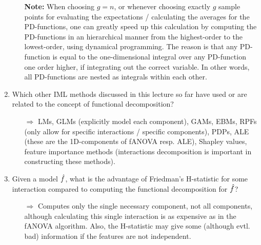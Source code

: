 \begin{enumerate}
\begin{itemize}
            \textbf{Note:}
            When choosing $g = n$, or whenever choosing exactly $g$ sample points for evaluating the expectations / calculating the averages for the PD-functions, one can greatly speed up this calculation by computing the PD-functions in an hierarchical manner from the highest-order to the lowest-order, using dynamical programming.
            The reason is that any PD-function is equal to the one-dimensional integral over any PD-function one order higher, if integrating out the correct variable.
            In other words, all PD-functions are nested as integrals within each other.
    \end{itemize}
    \item 
    Which other IML methods discussed in this lecture so far have used or are related to the concept of functional decomposition?
    \begin{itemize}
        \item[$\Rightarrow$] LMs, GLMs (explicitly model each component), GAMs, EBMs, RPFs (only allow for specific interactions / specific components), PDPs, ALE (these are the 1D-components of fANOVA resp. ALE), Shapley values, feature importance methods (interactions decomposition is important in constructing these methods).
    \end{itemize}
    \item 
    Given a model $\hat{f}$, what is the advantage of Friedman's H-statistic for some interaction compared to computing the functional decomposition for $\hat{f}$?
    \begin{itemize}
        \item[$\Rightarrow$] Computes only the single necessary component, not all components, although calculating this single interaction is as expensive as in the fANOVA algorithm.
        Also, the H-statistic may give some (although evtl. bad) information if the features are not independent.
    \end{itemize}


\end{enumerate}
